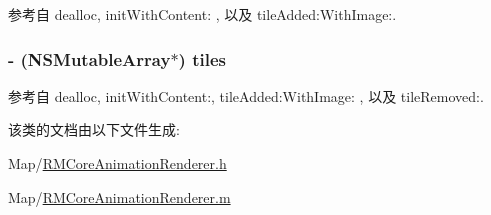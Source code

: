 参考自 dealloc, init\-With\-Content\-: , 以及 tile\-Added\-:\-With\-Image\-:.

\hypertarget{interface_r_m_core_animation_renderer_ac99c17e8a4f0a759ef3482913ab05115}{
\subsubsection[{tiles}]{\setlength{\rightskip}{0pt plus 5cm}-\/ (N\-S\-Mutable\-Array$\ast$) tiles\hspace{0.3cm}{\ttfamily [protected]}}}\label{interface_r_m_core_animation_renderer_ac99c17e8a4f0a759ef3482913ab05115}


参考自 dealloc, init\-With\-Content\-:, tile\-Added\-:\-With\-Image\-: , 以及 tile\-Removed\-:.



该类的文档由以下文件生成\-:\begin{DoxyCompactItemize}
\item 
Map/\hyperlink{_r_m_core_animation_renderer_8h}{R\-M\-Core\-Animation\-Renderer.\-h}\item 
Map/\hyperlink{_r_m_core_animation_renderer_8m}{R\-M\-Core\-Animation\-Renderer.\-m}\end{DoxyCompactItemize}
